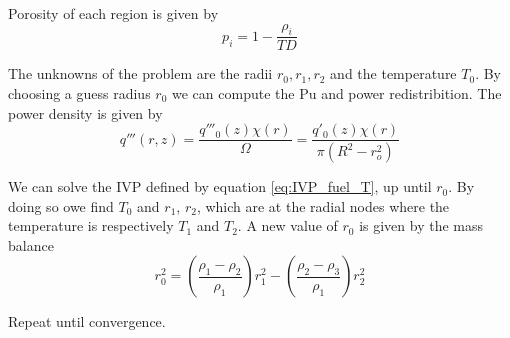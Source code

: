 \documentclass{article}
\newcommand{\deriv}[3][]{\frac{d^{#1} #2}{d #3^{#1}}}
\begin{document}
Porosity of each region is given by
\[
  p_i = 1 - \frac{\rho_i}{TD}
\]

The unknowns of the problem are the radii \(r_0, r_1, r_2\) and the temperature \(T_0\). By choosing a guess radius \(r_0\) we can compute the Pu and power redistribition. The power density is given by
\[
  q'''(r,z) = \frac{q'''_0(z)\chi(r)}{\Omega} = \frac{q'_0(z)\chi(r)}{\pi(R^2 - r_o^2)}
\]

We can solve the IVP defined by equation \ref{eq:IVP_fuel_T}, up until \(r_0\). By doing so owe find \(T_0\) and \(r_1\), \(r_2\), which are at the radial nodes where the temperature is respectively \(T_1\) and \(T_2\). A new value of \(r_0\) is given by the mass balance
\begin{equation} 
  r_0^2 = \left(\frac{\rho_1 - \rho_2}{\rho_1}\right)r_1^2 - \left(\frac{\rho_2 - \rho_3}{\rho_1}\right)r_2^2
  \label{eq:mass_balance}
\end{equation}

Repeat until convergence.



%
\end{document}

